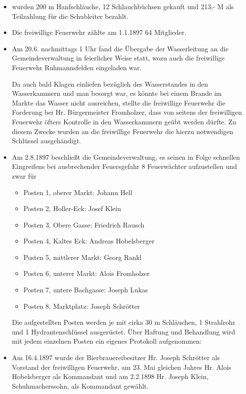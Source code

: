 \documentclass[12pt,a4paper]{book}
\begin{document}
\begin{itemize}
\item wurden 200 m Hanfschläuche, 12 Schlauchbüchsen gekauft und 213,- M als
Teilzahlung für die Schubleiter bezahlt.

\item Die freiwillige Feuerwehr zählte am 1.1.1897 64 Mitglieder.

\item Am 20.6. nachmittags 1 Uhr fand die Übergabe der Wasserleitung an die
Gemeindeverwaltung in feierlicher Weise statt, wozu auch die freiwillige
Feuerwehr Ruhmannsfelden eingeladen war.

Da auch bald Klagen einliefen bezüglich des Wasserstandes in den
Wasserkammern und man besorgt war, es könnte bei einem Brande im Markte das
Wasser nicht ausreichen, stellte die freiwillige Feuerwehr die Forderung bei Hr.
Bürgermeister Fromholzer, dass von seitens der freiwilligen Feuerwehr öfters
Kontrolle in den Wasserkammern geübt werden dürfte. Zu diesem Zwecke wurden an
die freiwillige Feuerwehr die hierzu notwendigen Schlüssel ausgehändigt.

\item Am 2.8.1897 beschließt die Gemeindeverwaltung, es seinen in Folge
schnellen Eingreifens bei ausbrechender Feuersgefahr 8 Feuerwächter aufzustellen
und zwar für

\begin{itemize}
\item Posten 1, oberer Markt: Johann Hell
\item Posten 2, Holler-Eck: Josef Klein
\item Posten 3, Obere Gasse: Friedrich Rausch
\item Posten 4, Kaltes Eck: Andreas Hobelsberger
\item Posten 5, mittlerer Markt: Georg Rankl
\item Posten 6, unterer Markt: Alois Fromholzer
\item Posten 7, untere Bachgasse: Joseph Lukas
\item Posten 8, Marktplatz: Joseph Schrötter
\end{itemize}

Die aufgestellten Posten werden je mit cirka 30 m Schläuchen, 1 Strahlrohr
und 1 Hydrantenschlüssel ausgerüstet. Über Haftung und Behandlung wird mit jedem
einzelnen Posten ein eigenes Protokoll aufgenommen:

\item Am 16.4.1897 wurde der Bierbrauereibesitzer Hr. Joseph Schrötter als
Vorstand der freiwilligen Feuerwehr, am 23. Mai gleichen Jahres Hr. Alois
Hobelsberger als Kommandant und am 2.2.1898 Hr. Joseph Klein, Schuhmacherssohn,
als Kommandant gewählt.
\end{itemize}
\end{document}

